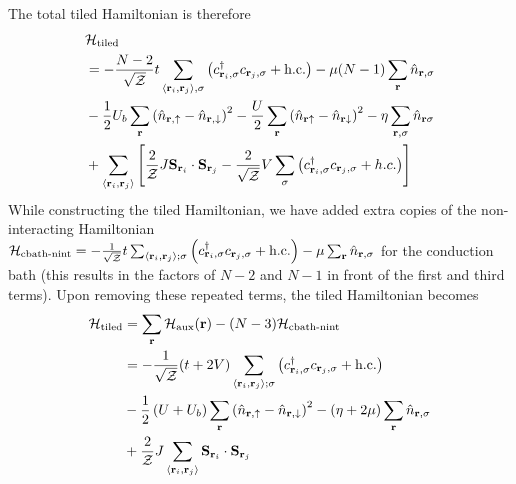 \documentclass[reprint,hidelinks,onecolumn]{revtex4-2}
\begin{document}
The total tiled Hamiltonian is therefore
\begin{equation}\begin{aligned}
	&\mathcal{H}_\text{tiled} \\
	&= -\frac{N-2}{\sqrt\mathcal{Z}}t\sum_{\left<{\bf r}_i, {\bf r}_j\right>,\sigma}\left(c^\dagger_{{\bf r}_i,\sigma}c_{{\bf r}_j,\sigma} + \text{h.c.}\right) - \mu (N-1) \sum_{{\bf r}}\hat n_{{\bf r},\sigma}\\
	&- \frac{1}{2}U_b\sum_{\bf r}\left(\hat n_{{\bf r} , \uparrow} - \hat n_{{\bf r} , \downarrow}\right)^2  -\frac{U}{2}\sum_{{\bf r}}\left(\hat n_{{\bf r} \uparrow} - \hat n_{{\bf r} \downarrow} \right)^2 - \eta\sum_{{\bf r},\sigma} \hat n_{{\bf r}\sigma}\\
	& + \sum_{\left< {\bf r}_i, {\bf r}_j\right>}\left[\frac{2}{\mathcal{Z}}J {\bf S}_{{\bf r}_i}\cdot{\bf S}_{{\bf r}_j} - \frac{2}{\sqrt\mathcal{Z}}V \sum_{\sigma}\left(c^\dagger_{{\bf r}_i,\sigma} c_{{{\bf r}_j},\sigma} + h.c.\right)\right]
\end{aligned}\end{equation}
While constructing the tiled Hamiltonian, we have added extra copies of the non-interacting Hamiltonian \(\mathcal{H}_\text{cbath-nint} = -\frac{1}{\sqrt\mathcal{Z}}t\sum_{\left<{\bf r}_i, {\bf r}_j\right>;\sigma}\left(c^\dagger_{{\bf r}_i,\sigma}c_{{\bf r}_j,\sigma} + \text{h.c.}\right) - \mu \sum_{{\bf r}}\hat n_{{\bf r},\sigma}\) for the conduction bath (this results in the factors of \(N-2\) and \(N-1\) in front of the first and third terms). Upon removing these repeated terms, the tiled Hamiltonian becomes
\begin{equation}\begin{aligned}
	\mathcal{H}_\text{tiled} &= \sum_{{\bf r}}\mathcal{H}_\text{aux}({\bf r}) - (N-3)\mathcal{H}_\text{cbath-nint}\\
							 &= -\frac{1}{\sqrt\mathcal{Z}}(t + 2V)\sum_{\left<{\bf r}_i, {\bf r}_j\right>;\sigma}\left(c^\dagger_{{\bf r}_i,\sigma}c_{{\bf r}_j,\sigma} + \text{h.c.}\right) \\
							 &- \frac{1}{2}\left(U + U_b\right)\sum_{\bf r}\left(\hat n_{{\bf r} , \uparrow} - \hat n_{{\bf r} , \downarrow}\right)^2 - \left(\eta + 2\mu\right) \sum_{{\bf r}}\hat n_{{\bf r},\sigma} \\
							 &+ \frac{2}{\mathcal{Z}}J\sum_{\left< {\bf r}_i, {\bf r}_j\right>} {\bf S}_{{\bf r}_i}\cdot{\bf S}_{{\bf r}_j}
\end{aligned}\end{equation}
\end{document}
